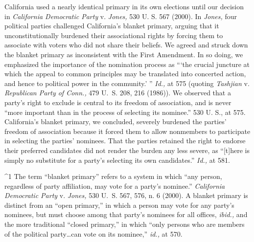   California used a nearly identical primary in its own elections until
our decision in \emph{California Democratic Party} v. \emph{Jones,} 530
U. S. 567 (2000). In \emph{Jones,} four political parties challenged
California's blanket primary, arguing that it unconstitutionally
burdened their associational rights by forcing them to associate with
voters who did not share their beliefs. We agreed and struck down
the blanket primary as inconsistent with the First Amendment. In so
doing, we emphasized the importance of the nomination process as
``‘the crucial juncture at which the appeal to common principles
may be translated into concerted action, and hence to political power
in the community.' '' \emph{Id.,} at 575 (quoting \emph{Tashjian} v.
\emph{Republican Party of Conn.,} 479 U.~S. 208, 216 (1986)). We
observed that a party's right to exclude is central to its freedom
of association, and is never ``more important than in the process
of selecting its nominee.'' 530 U. S., at 575. California's
blanket primary, we concluded, severely burdened the parties' freedom
of association because it \newpage  forced them to allow nonmembers to
participate in selecting the parties' nominees. That the parties
retained the right to endorse their preferred candidates did not render
the burden any less severe, as ``[t]here is simply no substitute for a
party's selecting its own candidates.'' \emph{Id.,} at 581.

^1 The term ``blanket primary'' refers to a system in which ``any
person, regardless of party affiliation, may vote for a party's
nominee.'' \emph{California Democratic Party} v. \emph{Jones,} 530
U.~S. 567, 576, n. 6 (2000). A blanket primary is distinct from
an ``open primary,'' in which a person may vote for any party's
nominees, but must choose among that party's nominees for all offices,
\emph{ibid.,} and the more traditional ``closed primary,'' in which
``only persons who are members of the political party\dots can vote
on its nominee,'' \emph{id.,} at 570.


